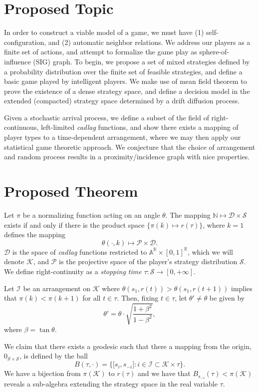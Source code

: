 \documentclass[10pt]{article}
\newcommand{\mcI}{\mathcal{I}}
\newcommand{\mcP}{\mathcal{P}}
\newcommand{\mcK}{\mathcal{K}}
\newcommand{\mcS}{\mathcal{S}}
\newcommand{\mcD}{\mathcal{D}}
\theoremstyle{definition}
\begin{document}
\section{Proposed Topic}

In order to construct a
viable model of a game, we must have (1) self-configuration, and (2) automatic neighbor
relations. We address our players as a finite set of actions, and attempt to formalize the game play as sphere-of-
influence (SIG) graph. To begin, we propose a set of mixed strategies defined by a probability
distribution over the finite set of feasible strategies, and define a basic game
played by intelligent players.
We make use of mean field theorem to prove the existence of a dense strategy
space, and define a decision model in the
extended (compacted) strategy space determined by a drift diffusion process.

Given a stochastic arrival process, we define a subset of the field of
right-continuous, left-limited \emph{cadlag} 
functions, and show there exists a mapping of player types to a time-dependent
arrangement, where we may then apply our statistical game theoretic approach.
We conjecture that the choice of arrangement and random process results in a
proximity/incidence graph with nice properties.


\section{Proposed Theorem}

Let $\pi$ be a normalizing function acting on an angle $\theta$. 
The mapping $\mathbb{N} \mapsto \mcD\times \mcS$ exists if and only if there is
the product space $\lbrace \pi(k) \mapsto r(\tau)\rbrace$, where $k=1$ defines
the mapping 
$$
    \theta(\cdot, k) \mapsto \mcP \times \mcD.
$$
$\mcD$ is the space of \emph{cadlag} functions restricted to
$\mathbb{A}^\mathbb{R} \times [0,1]^\mathbb{R}$, which we will denote $\mcK$, 
and $\mcP$ is the projective space of the
player's strategy distribution $\mcS$. We define right-continuity as 
a \emph{stopping time} $\tau:\mcS \rightarrow [0,+\infty]$.

Let $\mcI$ be an arrangement on $\mcK$ where
$\theta (s_1, r(t)) > \theta (s_1, r(t+1))$ implies that $\pi(k) < \pi
(k+1)$ for all $t\in\tau$.
Then, fixing $t\in \tau$, let $\theta' \ne \theta$ be given by 
$$
    \theta' = \theta \cdot \displaystyle\sqrt{\frac{1+\beta^2}{1-\beta^2}},
$$
where $\beta = \tan\theta$. 

We claim that there exists a geodesic such that there a
mapping from the origin, $0_{\mcS\times\mcS}$, is defined by the ball
$$
    B(\tau, \cdot) = \lbrace \lbrack s_i, s_{-i}\rbrack : i \in \mcI \subset
    \mcK\times \tau \rbrace.
$$
We have a bijection from $\pi(\mcK)$ to $r(\tau)$ and we have that
$B_{s_{-i}}(\tau) < \pi(\mcK)$ reveals a sub-algebra extending the strategy space
in the real variable $\tau$. 
\end{document}
